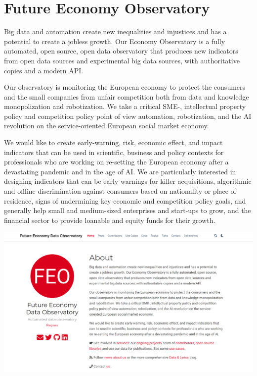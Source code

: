 \documentclass[
  a4paper,
  openany, a4paper, oneside]{book}
\begin{document}
\hypertarget{future-economy}{%
\chapter{Future Economy Observatory}\label{future-economy}}

Big data and automation create new inequalities and injustices and has a potential to create a jobless growth. Our Economy Observatory is a fully automated, open source, open data observatory that produces new indicators from open data sources and experimental big data sources, with authoritative copies and a modern API.

Our observatory is monitoring the European economy to protect the consumers and the small companies from unfair competition both from data and knowledge monopolization and robotization. We take a critical SME-, intellectual property policy and competition policy point of view automation, robotization, and the AI revolution on the service-oriented European social market economy.

We would like to create early-warning, risk, economic effect, and impact indicators that can be used in scientific, business and policy contexts for professionals who are working on re-setting the European economy after a devastating pandemic and in the age of AI. We are particularly interested in designing indicators that can be early warnings for killer acquisitions, algorithmic and offline discrimination against consumers based on nationality or place of residence, signs of undermining key economic and competition policy goals, and generally help small and medium-sized enterprises and start-ups to grow, and the financial sector to provide loanable and equity funds for their growth.

\begin{center}\includegraphics[width=0.8\linewidth]{plots/screenshots/fmo_screenshot} \end{center}
\end{document}
